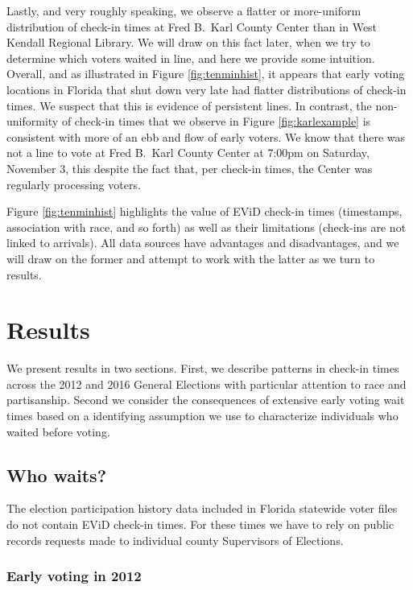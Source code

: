 \documentclass[12pt,titlepage]{article}
\begin{document}
Lastly, and very roughly speaking, we observe a flatter or
more-uniform distribution of check-in times at Fred B.\ Karl County
Center than in West Kendall Regional Library.  We will draw on this
fact later, when we try to determine which voters waited in line, and
here we provide some intuition.  Overall, and as illustrated in Figure
\ref{fig:tenminhist}, it appears that early voting locations in
Florida that shut down very late had flatter distributions of check-in
times.  We suspect that this is evidence of persistent lines.  In
contrast, the non-uniformity of check-in times that we observe in
Figure \ref{fig:karlexample} is consistent with more of an ebb and
flow of early voters.  We know that there was not a line to vote at
Fred B.\ Karl County Center at 7:00pm on Saturday, November 3, this
despite the fact that, per check-in times, the Center was regularly
processing voters.

Figure \ref{fig:tenminhist} highlights the value of EViD check-in
times (timestamps, association with race, and so forth) as well as
their limitations (check-ins are not linked to arrivals).  All data
sources have advantages and disadvantages, and we will draw on the
former and attempt to work with the latter as we turn to results.

\section*{Results}

We present results in two sections.  First, we describe patterns in
check-in times across the 2012 and 2016 General Elections with
particular attention to race and partisanship.  Second we consider the
consequences of extensive early voting wait times based on a
identifying assumption we use to characterize individuals who waited
before voting.

\subsection*{Who waits?}

The election participation history data included in Florida statewide
voter files do not contain EViD check-in times.  For these times we
have to rely on public records requests made to individual county
Supervisors of Elections.

\subsubsection*{Early voting in 2012}
\end{document}
